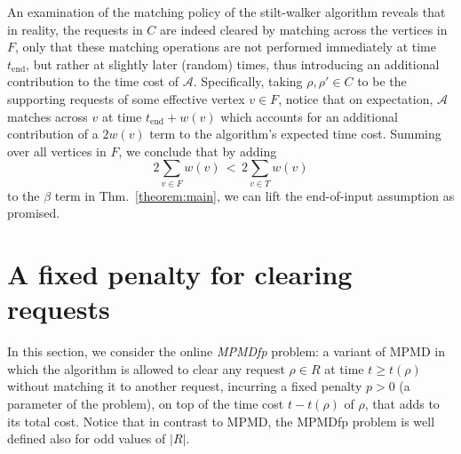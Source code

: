 \documentclass[11pt]{article}
\def\LongVersion{}
\def\LongVersionEnd{}
\theoremstyle{definition}
\theoremstyle{plain}
\theoremstyle{definition}
\theoremstyle{plain}
\theoremstyle{definition}
\theoremstyle{plain}
\newcommand{\Thm}{Thm.}
\newcommand{\EndTime}{\mathit{t}_{\mathrm{end}}}
\newcommand{\A}{\mathcal{A}}
\begin{document}
An examination of the matching policy of the stilt-walker algorithm reveals
that in reality, the requests in $C$ are indeed cleared by matching across the
vertices in $F$, only that these matching operations are not performed
immediately at time $\EndTime$, but rather at slightly later (random) times,
thus introducing an additional contribution to the time cost of $\A$.
Specifically, taking
$\rho, \rho' \in C$
to be the supporting requests of some effective vertex
$v \in F$,
notice that on expectation, $\A$ matches across $v$ at time
$\EndTime + w(v)$
which accounts for an additional contribution of a $2 w(v)$ term to the
algorithm's expected time cost.
Summing over all vertices in $F$, we conclude that by adding
\[
2 \sum_{v \in F} w(v)
\, < \,
2 \sum_{v \in T} w(v)
\]
to the $\beta$ term in \Thm{}~\ref{theorem:main}, we can lift the end-of-input
assumption as promised.
\LongVersionEnd %

\LongVersion %
\section{A fixed penalty for clearing requests}
\label{section:fixed-penalty}
In this section, we consider the online \emph{MPMDfp} problem:
a variant of MPMD in which the algorithm is allowed to clear any request
$\rho \in R$
at time
$t \geq t(\rho)$
without matching it to another request, incurring a fixed penalty
$p > 0$
(a parameter of the problem), on top of the time cost
$t - t(\rho)$
of $\rho$,
that adds to its total cost.
Notice that in contrast to MPMD, the MPMDfp problem is well defined also for
odd values of $|R|$.
\end{document}
